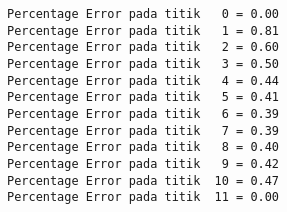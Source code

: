 \documentclass[11pt]{article}
\begin{document}
    \begin{Verbatim}[commandchars=\\\{\}]
Percentage Error pada titik   0 = 0.00
Percentage Error pada titik   1 = 0.81
Percentage Error pada titik   2 = 0.60
Percentage Error pada titik   3 = 0.50
Percentage Error pada titik   4 = 0.44
Percentage Error pada titik   5 = 0.41
Percentage Error pada titik   6 = 0.39
Percentage Error pada titik   7 = 0.39
Percentage Error pada titik   8 = 0.40
Percentage Error pada titik   9 = 0.42
Percentage Error pada titik  10 = 0.47
Percentage Error pada titik  11 = 0.00

    \end{Verbatim}


    
    
    
    
\end{document}
